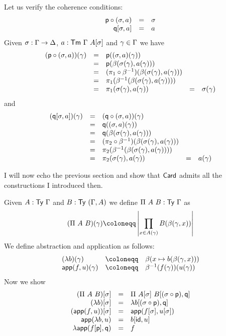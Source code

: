 Let us verify the coherence conditions:
\[
  \begin{array}{rcl}
    \mathsf{p} \circ (\sigma, a) &=& \sigma \\
    \mathsf{q} [\sigma, a] &=& a
  \end{array}
\]
Given \(\sigma : \Gamma \to \Delta\), \(a : \mathsf{Tm}\ \Gamma\ A[\sigma]\) and
\(\gamma \in \Gamma\) we have
\[
  \begin{array}{lclcl}
    (\mathsf{p} \circ (\sigma, a))(\gamma) &=&
    \mathsf{p}((\sigma, a)(\gamma)) \\
    &=& \mathsf{p}(\beta(\sigma(\gamma),a(\gamma))) \\
    &=& (\pi_1 \circ \beta^{-1})(\beta(\sigma(\gamma),a(\gamma))) \\
    &=& \pi_1(\beta^{-1}(\beta(\sigma(\gamma),a(\gamma)))) \\
    &=& \pi_1(\sigma(\gamma), a(\gamma)) &=& \sigma(\gamma)
  \end{array}
\]
and
\[
  \begin{array}{lclcl}
    (\mathsf{q} [\sigma, a])(\gamma) &=&
    (\mathsf{q} \circ (\sigma, a))(\gamma) \\
    &=& \mathsf{q}((\sigma,a)(\gamma)) \\
    &=& \mathsf{q}(\beta(\sigma(\gamma),a(\gamma))) \\
    &=& (\pi_2 \circ \beta^{-1})(\beta(\sigma(\gamma),a(\gamma))) \\
    &=& \pi_2(\beta^{-1}(\beta(\sigma(\gamma),a(\gamma)))) \\
    &=& \pi_2(\sigma(\gamma),a(\gamma)) &=& a(\gamma)
  \end{array}
\]

I will now echo the previous section and show that \(\mathsf{Card}\) admits all the
constructions I introduced then.


Given \(A : \mathsf{Ty}\ \Gamma\) and \(B : \mathsf{Ty}\ (\Gamma, A)\) we define
\(\Pi\ A\ B : \mathsf{Ty}\ \Gamma\) as
\[
  (\Pi\ A\ B)(\gamma) \coloneqq \card{\prod_{x \in A(\gamma)} B(\beta(\gamma,x))}
\]
We define abstraction and application as follows:
\[
  \begin{array}{lcl}
    (\lambda b)(\gamma) &\coloneqq& \beta(x \mapsto b(\beta(\gamma,x))) \\
    \capp(f,u)(\gamma) &\coloneqq& \beta^{-1}(f(\gamma))(u(\gamma))
  \end{array}
\]
Now we show
\[
  \begin{array}{rcl}
    (\Pi\ A\ B)[\sigma] &=& \Pi\ A[\sigma]\ B[(\sigma \circ \mathsf{p}), \mathsf{q}] \\
    (\lambda b)[\sigma] &=& \lambda b[(\sigma \circ \mathsf{p}), \mathsf{q}] \\
    (\mathsf{app}(f,u))[\sigma] &=& \mathsf{app}(f[\sigma],u[\sigma]) \\
    \mathsf{app}(\lambda b, u) &=& b[\mathsf{id}, u] \\
    \lambda \mathsf{app}(f[\mathsf{p}], \mathsf{q}) &=& f
  \end{array}
\]

